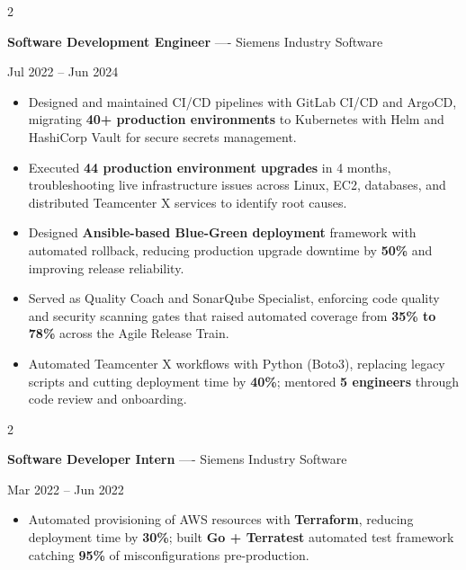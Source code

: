 \documentclass[10pt, letterpaper]{article}
\newenvironment{highlights}{
    \begin{itemize}[
        topsep=0.10 cm,
        parsep=0.06 cm,
        partopsep=0pt,
        itemsep=0.06 cm,
        leftmargin=12pt
    ]
}{
    \end{itemize}
}
\newenvironment{twocolentry}[2][]{
    \onecolentry
    \def\secondColumn{#2}
    \setcolumnwidth{\fill, 4.5 cm}
    \begin{paracol}{2}
}{
    \switchcolumn \raggedleft \secondColumn
    \end{paracol}
    \endonecolentry
}
\begin{document}
\vspace{0.15 cm}

\begin{twocolentry}{Jul 2022 -- Jun 2024}
\textbf{Software Development Engineer} ---- Siemens Industry Software
\end{twocolentry}
\begin{highlights}
  \item Designed and maintained CI/CD pipelines with GitLab CI/CD and ArgoCD, migrating \textbf{40+ production environments} to Kubernetes with Helm and HashiCorp Vault for secure secrets management.
  \item Executed \textbf{44 production environment upgrades} in 4 months, troubleshooting live infrastructure issues across Linux, EC2, databases, and distributed Teamcenter X services to identify root causes.
  \item Designed \textbf{Ansible-based Blue-Green deployment} framework with automated rollback, reducing production upgrade downtime by \textbf{50\%} and improving release reliability.
  \item Served as Quality Coach and SonarQube Specialist, enforcing code quality and security scanning gates that raised automated coverage from \textbf{35\% to 78\%} across the Agile Release Train.
  \item Automated Teamcenter X workflows with Python (Boto3), replacing legacy scripts and cutting deployment time by \textbf{40\%}; mentored \textbf{5 engineers} through code review and onboarding.
\end{highlights}

\vspace{0.15 cm}

\begin{twocolentry}{Mar 2022 -- Jun 2022}
\textbf{Software Developer Intern} ---- Siemens Industry Software
\end{twocolentry}
\begin{highlights}
  \item Automated provisioning of AWS resources with \textbf{Terraform}, reducing deployment time by \textbf{30\%}; built \textbf{Go + Terratest} automated test framework catching \textbf{95\%} of misconfigurations pre-production.
\end{highlights}
\end{document}
